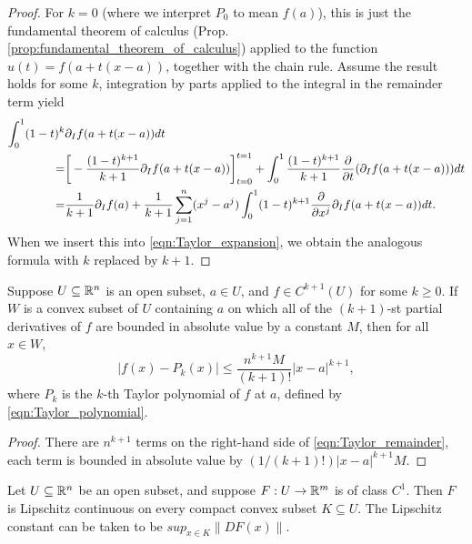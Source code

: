\documentclass[11pt,a4paper]{article}
\begin{document}
\begin{proof}
For $k = 0$ (where we interpret $P_0$ to mean $f(a)$), this is just the fundamental theorem of calculus (Prop. \ref{prop:fundamental_theorem_of_calculus}) applied to the function $u(t) = f(a+t(x-a))$, together with the chain rule. Assume the result holds for some $k$, integration by parts applied to the integral in the remainder term yield
\begin{align*}
\int_0^1 (1-t)^k&\partial_I f(a+t(x-a)) dt \\
=& \bigg[ -\dfrac{(1-t)^{k+1}}{k+1}\partial_I f(a+t(x-a)) \bigg]_{t = 0}^{t=1} +
\int_0^1 \dfrac{(1-t)^{k+1}}{k+1}\dfrac{\partial}{\partial t}(\partial_I f(a+t(x-a))) dt \\
=& \dfrac{1}{k+1}\partial_I f(a) + \dfrac{1}{k+1} \sum_{j = 1}^n (x^j-a^j)\int_0^1 (1-t)^{k+1} \dfrac{\partial}{\partial x^{j}} \partial_I f(a+t(x-a)) dt.
\end{align*}
When we insert this into \eqref{eqn:Taylor_expansion}, we obtain the analogous formula with $k$ replaced by $k+1$.
\end{proof}

\begin{corollary}
Suppose $U\subseteq\mathbb{R}^n$ is an open subset, $a\in U$, and $f\in C^{k+1}(U)$ for some $k\ge 0$. If $W$ is a convex subset of $U$ containing $a$ on which all of the $(k+1)$-st partial derivatives of $f$ are bounded in absolute value by a constant $M$, then for all $x\in W$,
\begin{equation*}
|f(x) - P_k(x)|\le \dfrac{n^{k+1}M}{(k+1)!}|x-a|^{k+1},
\end{equation*}
where $P_k$ is the $k$-th Taylor polynomial of $f$ at $a$, defined by \eqref{eqn:Taylor_polynomial}.
\end{corollary}

\begin{proof}
There are $n^{k+1}$ terms on the right-hand side of \eqref{eqn:Taylor_remainder}, each term is bounded in absolute value by $(1/(k+1)!)|x-a|^{k+1}M$.
\end{proof}

\begin{proposition} \label{prop:Lipschitz_continuity_of_C1_functions}
Let $U\subseteq \mathbb{R}^n$ be an open subset, and suppose $F:U\rightarrow \mathbb{R}^m$ is of class $C^1$. Then $F$ is Lipschitz continuous on every compact convex subset $K\subseteq U$. The Lipschitz constant can be taken to be $sup_{x\in K}\|DF(x)\|$.
\end{proposition}
\end{document}
